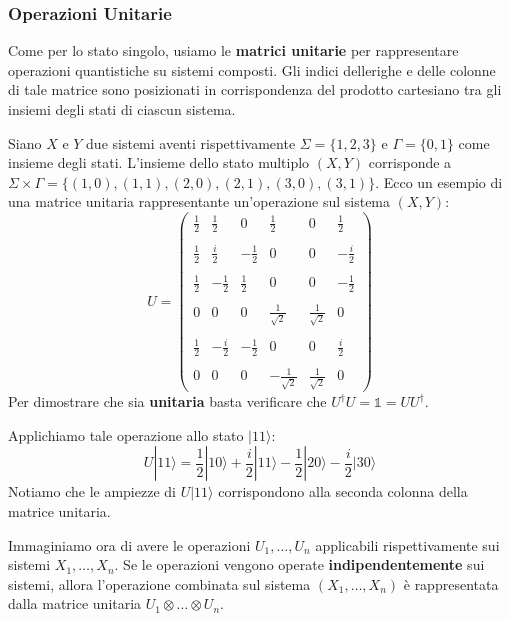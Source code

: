 \subsubsection{Operazioni Unitarie}
Come per lo stato singolo, usiamo le \textbf{matrici unitarie} per rappresentare operazioni quantistiche su sistemi composti. Gli indici dellerighe e delle colonne di tale matrice sono posizionati in corrispondenza del prodotto cartesiano tra gli insiemi degli stati di ciascun sistema.
\begin{example}{}{}
    Siano $X$ e $Y$ due sistemi aventi rispettivamente $\Sigma = \{1,2,3\}$ e $\Gamma = \{0,1\}$ come insieme degli stati. L'insieme dello stato multiplo $(X,Y)$ corrisponde a $\Sigma \times \Gamma = \{(1,0), (1,1), (2,0), (2,1), (3,0),(3,1)\}$. Ecco un esempio di una matrice unitaria rappresentante un'operazione sul sistema $(X,Y)$:
    \begin{equation*}
        U = \left(\begin{array}{cccccc}
            \frac{1}{2} & \frac{1}{2} & 0 & \frac{1}{2} & 0 & \frac{1}{2}  \\ \\
            \frac{1}{2} & \frac{i}{2} & -\frac{1}{2} & 0 & 0 & -\frac{i}{2}  \\ \\
            \frac{1}{2} & -\frac{1}{2} & \frac{1}{2} & 0 & 0 & -\frac{1}{2}  \\ \\
            0 & 0 & 0 & \frac{1}{\sqrt{2}} & \frac{1}{\sqrt{2}} & 0  \\ \\
            \frac{1}{2} & -\frac{i}{2} & -\frac{1}{2} & 0 & 0 & \frac{i}{2}  \\ \\
           0 & 0 & 0 & -\frac{1}{\sqrt{2}} & \frac{1}{\sqrt{2}} & 0   
        \end{array}\right)
    \end{equation*}
    Per dimostrare che sia \textbf{unitaria} basta verificare che $U^{\dagger}U = \mathbb{1} = UU^{\dagger}$.

    Applichiamo tale operazione allo stato $|11\rangle$:
    \begin{equation*}
        U|11\rangle = \frac{1}{2}|10\rangle + \frac{i}{2}|11\rangle - \frac{1}{2}|20\rangle - \frac{i}{2}|30\rangle
    \end{equation*}
    Notiamo che le ampiezze di $U|11\rangle$ corrispondono alla seconda colonna della matrice unitaria.
\end{example}
Immaginiamo ora di avere le operazioni $U_1, \hdots, U_n$ applicabili rispettivamente sui sistemi $X_1, \hdots, X_n$. Se le operazioni vengono operate \textbf{indipendentemente} sui sistemi, allora l'operazione combinata sul sistema $(X_1, \hdots, X_n)$ è rappresentata dalla matrice unitaria $U_1 \otimes \hdots \otimes U_n$.

